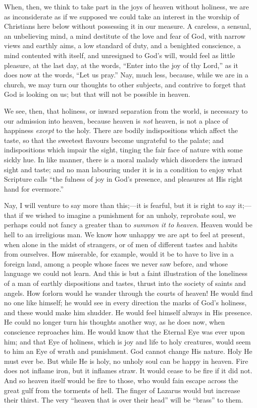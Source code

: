 When, then, we think to take part in the joys of
heaven without holiness, we are as inconsiderate as if we
supposed we could take an interest in the worship of
Christians here below without possessing it in our
measure. A careless, a sensual, an unbelieving mind, a
mind destitute of the love and fear of God, with narrow
views and earthly aims, a low standard of duty, and a
benighted conscience, a mind contented with itself, and
unresigned to God's will, would feel as little pleasure,
at the last day, at the words, ``Enter into the joy
of thy Lord,'' as it does now at the words, ``Let
us pray.'' Nay, much less, because, while we are in a
church, we may turn our thoughts to other subjects, and
contrive to forget that God is looking on us; but that
will not be possible in heaven.

We see, then, that holiness, or inward separation from
the world, is necessary to our admission into heaven,
because heaven is \emph{not} heaven, is not a place of
happiness \emph{except} to the holy. There are bodily
indispositions which affect the taste, so that the
sweetest flavours become ungrateful to the palate; and
indispositions which impair the sight, tinging the fair
face of nature with some sickly hue. In like manner,
there is a moral malady which disorders the inward sight
and taste; and no man labouring under it is in a
condition to enjoy what Scripture calls ``the fulness
of joy in God's presence, and pleasures at His right hand
for evermore.''

Nay, I will venture to say more than this;—it is
fearful, but it is right to say it;—that if we
wished to imagine a punishment for an unholy, reprobate
soul, we perhaps could not fancy a greater than to \emph{summon
it to heaven}. Heaven would be hell to an irreligious
man. We know how unhappy we are apt to feel at present,
when alone in the midst of strangers, or of men of
different tastes and habits from ourselves. How
miserable, for example, would it be to have to live in a
foreign land, among a people whose faces we never saw
before, and whose language we could not learn. And this
is but a faint illustration of the loneliness of a man of
earthly dispositions and tastes, thrust into the society
of saints and angels. How forlorn would he wander through
the courts of heaven! He would find no one like himself;
he would see in every direction the marks of God's
holiness, and these would make him shudder. He would feel
himself always in His presence. He could no longer turn
his thoughts another way, as he does now, when conscience
reproaches him. He would know that the Eternal Eye was
ever upon him; and that Eye of holiness, which is joy and
life to holy creatures, would seem to him an Eye of wrath
and punishment. God cannot change His nature. Holy He
must ever be. But while He is holy, no unholy soul can be
happy in heaven. Fire does not inflame iron, but it
inflames straw. It would cease to be fire if it did not.
And so heaven itself would be fire to those, who would
fain escape across the great gulf from the torments of
hell. The finger of Lazarus would but increase their
thirst. The very ``heaven that is over their
head'' will be ``brass'' to them.


